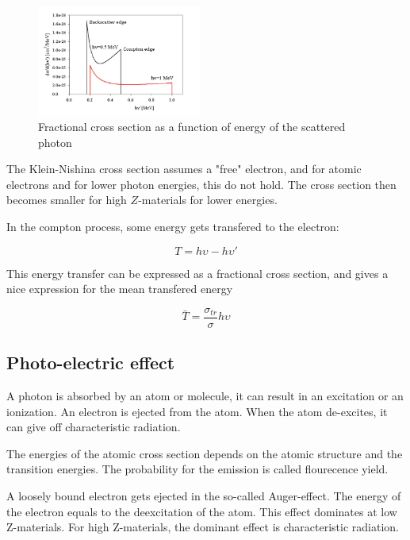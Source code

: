 \documentclass{article}
\begin{document}
\begin{figure}
    \centering
    \includegraphics[width = 0.48\textwidth]{photons/figs/kleinnishinaenergy}
    \caption{Fractional cross section as a function of energy of the scattered photon}
\end{figure}

The Klein-Nishina cross section assumes a "free" electron, and for atomic electrons and for lower photon energies, this do not hold.
The cross section then becomes smaller for high $Z$-materials for lower energies.

In the compton process, some energy gets transfered to the electron:

\begin{equation}
    T = h\upsilon - h \upsilon'
\end{equation}

This energy transfer can be expressed as a fractional cross section, and gives a nice expression for the mean transfered energy

\begin{equation}
    \bar{T} = \frac{\sigma_{tr}}{\sigma} h \upsilon
\end{equation}

\subsection{Photo-electric effect}

A photon is absorbed by an atom or molecule, it can result in an excitation or an ionization.
An electron is ejected from the atom.
When the atom de-excites, it can give off characteristic radiation.

The energies of the atomic cross section depends on the atomic structure and the transition energies.
The probability for the emission is called flourecence yield.

A loosely bound electron gets ejected in the so-called Auger-effect.
The energy of the electron equals to the deexcitation of the atom. 
This effect dominates at low Z-materials. 
For high Z-materials, the dominant effect is characteristic radiation.
\end{document}
